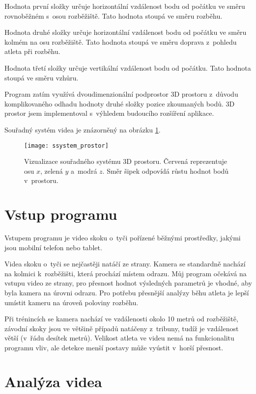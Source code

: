 Hodnota první složky určuje horizontální vzdálenost bodu od počátku ve směru rovnoběžném s~osou rozběžiště. Tato hodnota stoupá ve směru rozběhu.

Hodnota druhé složky určuje horizontální vzdálenost bodu od počátku ve směru kolmém na osu rozběžiště. Tato hodnota stoupá ve směru doprava z~pohledu atleta při rozběhu.

Hodnota třetí složky určuje vertikální vzdálenost bodu od počátku. Tato hodnota stoupá ve směru vzhůru.

Program zatím využívá dvoudimenzionální podprostor 3D prostoru z~důvodu komplikovaného odhadu hodnoty druhé složky pozice zkoumaných bodů. 3D prostor jsem implementoval s~výhledem budoucího rozšíření aplikace.

Souřadný systém videa je znázorněný na obrázku \ref{fig:ssystemprostor}.

\begin{figure}[h]\centering
    \texttt{[image: ssystem\_prostor]}
    \caption{
        \centering\small
        Vizualizace souřadného systému 3D prostoru. Červená reprezentuje osu $x$, zelená $y$ a~modrá $z$. Směr šipek odpovídá růstu hodnot bodů v~prostoru.
    }
    \label{fig:ssystemprostor}
\end{figure}




\section{Vstup programu}
\label{sec:vstup}

Vstupem programu je video skoku o~tyči pořízené běžnými prostředky, jakými jsou mobilní telefon nebo tablet.

Videa skoku o~tyči se nejčastěji natáčí ze strany. Kamera se standardně nachází na kolmici k~rozběžišti, která prochází místem odrazu. Můj program očekává na vstupu video ze strany, pro přesnost hodnot výsledných parametrů je vhodné, aby byla kamera na úrovni odrazu. Pro potřebu přesnější analýzy běhu atleta je lepší umístit kameru na úroveň poloviny rozběhu.

Při trénincích se kamera nachází ve vzdálenosti okolo 10 metrů od rozběžiště, závodní skoky jsou ve většině případů natáčeny z~tribuny, tudíž je vzdálenost větší (v~řádu desítek metrů). Velikost atleta ve videu nemá na funkcionalitu programu vliv, ale detekce menší postavy může vyústit v~horší přesnost.




\section{Analýza videa}

